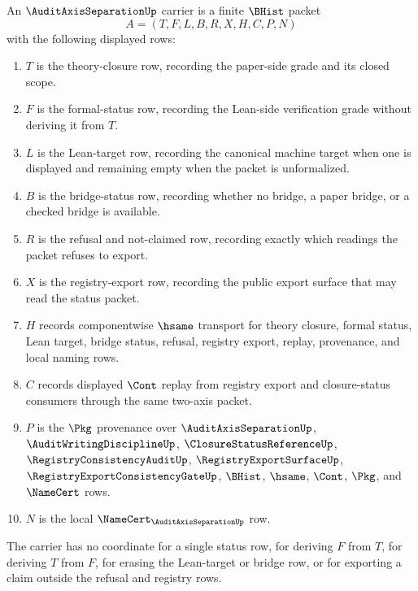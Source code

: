\begin{definition}
\label{def:audit-axis-separation-carrier}
An $\AuditAxisSeparationUp$ carrier is a finite $\BHist$ packet
$$
A=(T,F,L,B,R,X,H,C,P,N)
$$
with the following displayed rows:
\begin{enumerate}
\item $T$ is the theory-closure row, recording the paper-side grade and its closed scope.
\item $F$ is the formal-status row, recording the Lean-side verification grade without deriving it from $T$.
\item $L$ is the Lean-target row, recording the canonical machine target when one is displayed and remaining empty when the packet is unformalized.
\item $B$ is the bridge-status row, recording whether no bridge, a paper bridge, or a checked bridge is available.
\item $R$ is the refusal and not-claimed row, recording exactly which readings the packet refuses to export.
\item $X$ is the registry-export row, recording the public export surface that may read the status packet.
\item $H$ records componentwise $\hsame$ transport for theory closure, formal status, Lean target, bridge status, refusal, registry export, replay, provenance, and local naming rows.
\item $C$ records displayed $\Cont$ replay from registry export and closure-status consumers through the same two-axis packet.
\item $P$ is the $\Pkg$ provenance over $\AuditAxisSeparationUp$, $\AuditWritingDisciplineUp$, $\ClosureStatusReferenceUp$, $\RegistryConsistencyAuditUp$, $\RegistryExportSurfaceUp$, $\RegistryExportConsistencyGateUp$, $\BHist$, $\hsame$, $\Cont$, $\Pkg$, and $\NameCert$ rows.
\item $N$ is the local $\NameCert_{\AuditAxisSeparationUp}$ row.
\end{enumerate}
The carrier has no coordinate for a single status row, for deriving $F$ from $T$, for deriving $T$ from $F$, for erasing the Lean-target or bridge row, or for exporting a claim outside the refusal and registry rows.
\end{definition}

